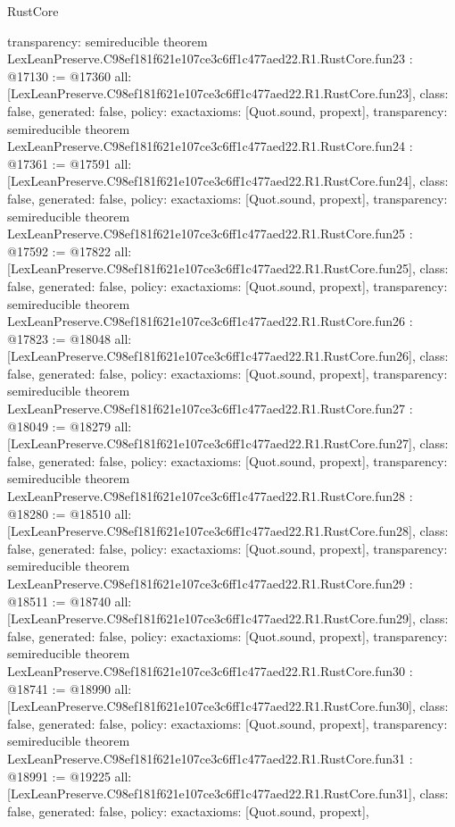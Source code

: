 \begin{lexlean}{RustCore}
\begin{coremodule}
{  transparency: semireducible
}
theorem LexLeanPreserve.C98ef181f621e107ce3c6ff1c477aed22.R1.RustCore.fun23 : @17130 := @17360 {
  all: [LexLeanPreserve.C98ef181f621e107ce3c6ff1c477aed22.R1.RustCore.fun23],
  class: false,
  generated: false,
  policy: exact{axioms: [Quot.sound, propext]},
  transparency: semireducible
}
theorem LexLeanPreserve.C98ef181f621e107ce3c6ff1c477aed22.R1.RustCore.fun24 : @17361 := @17591 {
  all: [LexLeanPreserve.C98ef181f621e107ce3c6ff1c477aed22.R1.RustCore.fun24],
  class: false,
  generated: false,
  policy: exact{axioms: [Quot.sound, propext]},
  transparency: semireducible
}
theorem LexLeanPreserve.C98ef181f621e107ce3c6ff1c477aed22.R1.RustCore.fun25 : @17592 := @17822 {
  all: [LexLeanPreserve.C98ef181f621e107ce3c6ff1c477aed22.R1.RustCore.fun25],
  class: false,
  generated: false,
  policy: exact{axioms: [Quot.sound, propext]},
  transparency: semireducible
}
theorem LexLeanPreserve.C98ef181f621e107ce3c6ff1c477aed22.R1.RustCore.fun26 : @17823 := @18048 {
  all: [LexLeanPreserve.C98ef181f621e107ce3c6ff1c477aed22.R1.RustCore.fun26],
  class: false,
  generated: false,
  policy: exact{axioms: [Quot.sound, propext]},
  transparency: semireducible
}
theorem LexLeanPreserve.C98ef181f621e107ce3c6ff1c477aed22.R1.RustCore.fun27 : @18049 := @18279 {
  all: [LexLeanPreserve.C98ef181f621e107ce3c6ff1c477aed22.R1.RustCore.fun27],
  class: false,
  generated: false,
  policy: exact{axioms: [Quot.sound, propext]},
  transparency: semireducible
}
theorem LexLeanPreserve.C98ef181f621e107ce3c6ff1c477aed22.R1.RustCore.fun28 : @18280 := @18510 {
  all: [LexLeanPreserve.C98ef181f621e107ce3c6ff1c477aed22.R1.RustCore.fun28],
  class: false,
  generated: false,
  policy: exact{axioms: [Quot.sound, propext]},
  transparency: semireducible
}
theorem LexLeanPreserve.C98ef181f621e107ce3c6ff1c477aed22.R1.RustCore.fun29 : @18511 := @18740 {
  all: [LexLeanPreserve.C98ef181f621e107ce3c6ff1c477aed22.R1.RustCore.fun29],
  class: false,
  generated: false,
  policy: exact{axioms: [Quot.sound, propext]},
  transparency: semireducible
}
theorem LexLeanPreserve.C98ef181f621e107ce3c6ff1c477aed22.R1.RustCore.fun30 : @18741 := @18990 {
  all: [LexLeanPreserve.C98ef181f621e107ce3c6ff1c477aed22.R1.RustCore.fun30],
  class: false,
  generated: false,
  policy: exact{axioms: [Quot.sound, propext]},
  transparency: semireducible
}
theorem LexLeanPreserve.C98ef181f621e107ce3c6ff1c477aed22.R1.RustCore.fun31 : @18991 := @19225 {
  all: [LexLeanPreserve.C98ef181f621e107ce3c6ff1c477aed22.R1.RustCore.fun31],
  class: false,
  generated: false,
  policy: exact{axioms: [Quot.sound, propext]},
}
\end{coremodule}
\end{lexlean}
